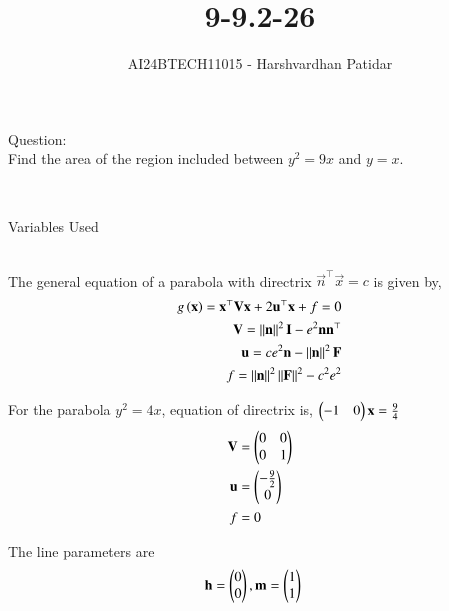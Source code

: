 \documentclass[journal]{IEEEtran}
\begin{document}

\vspace{3cm}

\title{9-9.2-26}
\author{AI24BTECH11015 - Harshvardhan Patidar}
 \maketitle
{\let\newpage\relax\maketitle}

\renewcommand{\thefigure}{\theenumi}
\renewcommand{\thetable}{\theenumi}
\setlength{\intextsep}{10pt} %


\renewcommand{\thetable}{\theenumi}

Question: \\
	Find the area of the region included between $y^2 = 9x$ and $y = x$.

\solution \\
	\begin{table}[h!]    
  		\centering
  		
  		\caption{Variables Used}
  		\label{tab1-1.9-6}
	\end{table}\\

	The general equation of a parabola with directrix $\vec{n}^{\top}\vec{x}=c$ is given by,
	\begin{align}
		g\left(\mathbf{x}\right)=\mathbf{x}^{\top}\mathbf{V}\mathbf{x}+2\mathbf{u}^{\top}\mathbf{x}+f=0\\
		\mathbf{V}=\left\lVert\mathbf{n}\right\rVert^2\mathbf{I}-e^2\mathbf{n}\mathbf{n}^{\top}\\
		\mathbf{u}=ce^2\mathbf{n}-\left\lVert\mathbf{n}\right\rVert^2\mathbf{F}\\
		f=\left\lVert\mathbf{n}\right\rVert^2\left\lVert\mathbf{F}\right\rVert^2-c^2e^2
	\end{align}

	For the parabola $y^2=4x$, equation of directrix is, $\begin{pmatrix}-1&0\end{pmatrix}\mathbf{x}=\frac{9}{4}$
	\begin{align}
		\mathbf{V}&=\begin{pmatrix}0&0\\0&1\end{pmatrix}\\
		\mathbf{u}&=\begin{pmatrix}-\frac{9}{2}\\0\end{pmatrix}\\
		f&=0
	\end{align}

	The line parameters are 
	\begin{align}
		\mathbf{h} &= \begin{pmatrix}0\\0\end{pmatrix} , \mathbf{m} = \begin{pmatrix}1\\1\end{pmatrix}
	\end{align}
\end{document}
